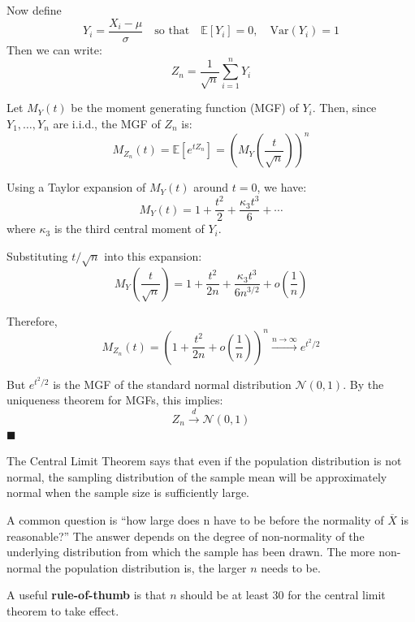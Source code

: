 \documentclass[twoside]{book}
\begin{document}
Now define
\[
Y_i = \frac{X_i - \mu}{\sigma}
\quad \text{so that} \quad \mathbb{E}[Y_i] = 0, \quad \text{Var}(Y_i) = 1
\]
Then we can write:
\[
Z_n = \frac{1}{\sqrt{n}} \sum_{i=1}^n Y_i
\]

Let $M_Y(t)$ be the moment generating function (MGF) of $Y_i$. Then, since $Y_1, \dots, Y_n$ are i.i.d., the MGF of $Z_n$ is:
\[
M_{Z_n}(t) = \mathbb{E}\left[ e^{t Z_n} \right] = \left( M_Y\left( \frac{t}{\sqrt{n}} \right) \right)^n
\]

Using a Taylor expansion of $M_Y(t)$ around $t = 0$, we have:
\[
M_Y(t) = 1 + \frac{t^2}{2} + \frac{\kappa_3 t^3}{6} + \cdots
\]
where $\kappa_3$ is the third central moment of $Y_i$.

Substituting $t / \sqrt{n}$ into this expansion:
\[
M_Y\left( \frac{t}{\sqrt{n}} \right)
= 1 + \frac{t^2}{2n} + \frac{\kappa_3 t^3}{6 n^{3/2}} + o\left( \frac{1}{n} \right)
\]

Therefore,
\[
M_{Z_n}(t) = \left( 1 + \frac{t^2}{2n} + o\left( \frac{1}{n} \right) \right)^n
\xrightarrow{n \to \infty} e^{t^2 / 2}
\]

But $e^{t^2/2}$ is the MGF of the standard normal distribution $\mathcal{N}(0,1)$. By the uniqueness theorem for MGFs, this implies:
\[
Z_n \xrightarrow{d} \mathcal{N}(0,1)
\]
\hfill$\blacksquare$

The Central Limit Theorem says that even if the population distribution is not normal, the sampling distribution of the sample mean will be approximately normal when the sample size is sufficiently large.

A common question is ``how large does n have to be before the normality of $\overline{X}$ is reasonable?'' The answer
depends on the degree of non-normality of the underlying distribution from which the sample has been drawn.
The more non-normal the population distribution is, the larger $n$ needs to be.
\begin{textbox}
A useful \textbf{rule-of-thumb} is that $n$ should be at least 30 for the central limit theorem to take effect.
\end{textbox}

\end{document}
